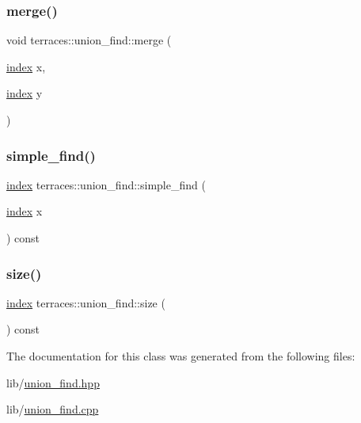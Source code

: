 \subsubsection{\texorpdfstring{merge()}{merge()}}
{\footnotesize\ttfamily void terraces\+::union\+\_\+find\+::merge (\begin{DoxyParamCaption}\item[{\hyperlink{namespaceterraces_adbc33ccb543d1634e96d0eb02e472c77}{index}}]{x,  }\item[{\hyperlink{namespaceterraces_adbc33ccb543d1634e96d0eb02e472c77}{index}}]{y }\end{DoxyParamCaption})}

\mbox{\label{classterraces_1_1union__find_ab873ad737cf121e74b2aa644006c35ee}} 
\subsubsection{\texorpdfstring{simple\+\_\+find()}{simple\_find()}}
{\footnotesize\ttfamily \hyperlink{namespaceterraces_adbc33ccb543d1634e96d0eb02e472c77}{index} terraces\+::union\+\_\+find\+::simple\+\_\+find (\begin{DoxyParamCaption}\item[{\hyperlink{namespaceterraces_adbc33ccb543d1634e96d0eb02e472c77}{index}}]{x }\end{DoxyParamCaption}) const\hspace{0.3cm}{\ttfamily [inline]}}

\mbox{\label{classterraces_1_1union__find_ae76d167c5073215dc310720bfc619d8d}} 
\subsubsection{\texorpdfstring{size()}{size()}}
{\footnotesize\ttfamily \hyperlink{namespaceterraces_adbc33ccb543d1634e96d0eb02e472c77}{index} terraces\+::union\+\_\+find\+::size (\begin{DoxyParamCaption}{ }\end{DoxyParamCaption}) const\hspace{0.3cm}{\ttfamily [inline]}}



The documentation for this class was generated from the following files\+:\begin{DoxyCompactItemize}
\item 
lib/\hyperlink{union__find_8hpp}{union\+\_\+find.\+hpp}\item 
lib/\hyperlink{lib_2union__find_8cpp}{union\+\_\+find.\+cpp}\end{DoxyCompactItemize}
